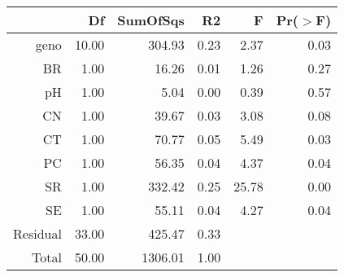 \begin{table}[ht]
\centering
\begin{tabular}{rrrrrr}
  \hline
 & Df & SumOfSqs & R2 & F & Pr($>$F) \\ 
  \hline
geno & 10.00 & 304.93 & 0.23 & 2.37 & 0.03 \\ 
  BR & 1.00 & 16.26 & 0.01 & 1.26 & 0.27 \\ 
  pH & 1.00 & 5.04 & 0.00 & 0.39 & 0.57 \\ 
  CN & 1.00 & 39.67 & 0.03 & 3.08 & 0.08 \\ 
  CT & 1.00 & 70.77 & 0.05 & 5.49 & 0.03 \\ 
  PC & 1.00 & 56.35 & 0.04 & 4.37 & 0.04 \\ 
  SR & 1.00 & 332.42 & 0.25 & 25.78 & 0.00 \\ 
  SE & 1.00 & 55.11 & 0.04 & 4.27 & 0.04 \\ 
  Residual & 33.00 & 425.47 & 0.33 &  &  \\ 
  Total & 50.00 & 1306.01 & 1.00 &  &  \\ 
   \hline
\end{tabular}
\end{table}
